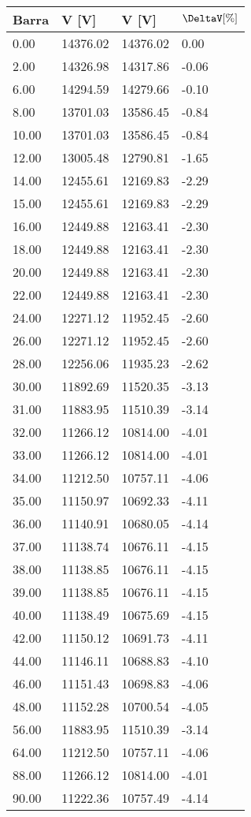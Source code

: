 \begin{tabular}{llll}
\toprule
\textbf{Barra}&\textbf{V [V]}&\textbf{V [V]}&\textbf{$\mathbf{\DeltaV [\%]}$}\\
\midrule
0.00&14376.02&14376.02&0.00\\
2.00&14326.98&14317.86&-0.06\\
6.00&14294.59&14279.66&-0.10\\
8.00&13701.03&13586.45&-0.84\\
10.00&13701.03&13586.45&-0.84\\
12.00&13005.48&12790.81&-1.65\\
14.00&12455.61&12169.83&-2.29\\
15.00&12455.61&12169.83&-2.29\\
16.00&12449.88&12163.41&-2.30\\
18.00&12449.88&12163.41&-2.30\\
20.00&12449.88&12163.41&-2.30\\
22.00&12449.88&12163.41&-2.30\\
24.00&12271.12&11952.45&-2.60\\
26.00&12271.12&11952.45&-2.60\\
28.00&12256.06&11935.23&-2.62\\
30.00&11892.69&11520.35&-3.13\\
31.00&11883.95&11510.39&-3.14\\
32.00&11266.12&10814.00&-4.01\\
33.00&11266.12&10814.00&-4.01\\
34.00&11212.50&10757.11&-4.06\\
35.00&11150.97&10692.33&-4.11\\
36.00&11140.91&10680.05&-4.14\\
37.00&11138.74&10676.11&-4.15\\
38.00&11138.85&10676.11&-4.15\\
39.00&11138.85&10676.11&-4.15\\
40.00&11138.49&10675.69&-4.15\\
42.00&11150.12&10691.73&-4.11\\
44.00&11146.11&10688.83&-4.10\\
46.00&11151.43&10698.83&-4.06\\
48.00&11152.28&10700.54&-4.05\\
56.00&11883.95&11510.39&-3.14\\
64.00&11212.50&10757.11&-4.06\\
88.00&11266.12&10814.00&-4.01\\
90.00&11222.36&10757.49&-4.14\\
\bottomrule
\end{tabular}
